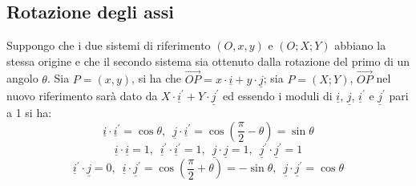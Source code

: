 \documentclass[a4paper,12pt, oneside]{book}
\begin{document}
\subsection{Rotazione degli assi}
Suppongo che i due sistemi di riferimento $(O,x,y)$ e $(O;X;Y)$ abbiano la stessa origine e che il secondo sistema sia ottenuto dalla rotazione del primo di un angolo $\theta$. Sia $P=(x,y)$, si ha che $\vec{OP}=x\cdot \underline{i}+y\cdot \underline{j}$; sia $P=(X;Y)$, $\vec{OP}$ nel nuovo riferimento sarà dato da $X\cdot \underline{i}^{'}+Y\cdot \underline{j}^{'}$ ed essendo i moduli di $\underline{i}$, $\underline{j}$, $\underline{i}^{'}$ e $\underline{j}^{'}$ pari a 1 si ha:
$$\underline{i}\cdot \underline{i}^{'}=\cos\theta,\,\,\, \underline{j}\cdot \underline{i}^{'}=\cos\left(\frac{\pi}{2}-\theta\right)=\sin\theta$$
$$\underline{i}\cdot \underline{i}=1,\,\,\,\underline{i}^{'}\cdot \underline{i}^{'}=1,\,\,\,\underline{j}\cdot \underline{j}=1,\,\,\,\underline{j}^{'}\cdot \underline{j}^{'}=1$$
$$\underline{i}^{'}\cdot \underline{j}=0,\,\,\, \underline{i}\cdot\underline{j}^{'}=\cos\left(\frac{\pi}{2}+\theta\right)=-\sin\theta,\,\,\, \underline{j}\cdot\underline{j}^{'}=\cos\theta$$
\end{document}
